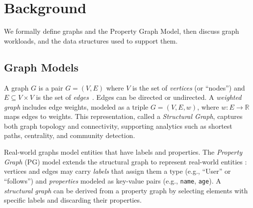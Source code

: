 \section{Background}
\label{sec:bg}
We formally define graphs and the Property Graph Model, then discuss graph workloads, and the data structures used to support them.

\subsection{Graph Models}
\label{sec:bg:model}
A graph $G$ is a pair $G = (V, E)$ where $V$ is the set of \textit{vertices} (or ``nodes'') and $E \subseteq V \times V$ is the set of \textit{edges}~\cite{diestel2017basics}.
Edges can be directed or undirected.
A \emph{weighted graph} includes edge weights, modeled as a triple $G = (V, E, w)$, where $w: E \rightarrow \mathbb{R}$ maps edges to weights.
This representation, called a \emph{Structural Graph}, captures both graph topology and connectivity, supporting analytics such as shortest paths, centrality, and community detection.

Real-world graphs model entities that have labels and properties.
The \emph{Property Graph} (PG) model extends the structural graph to represent real-world entities \cite{Angles_Arenas_Barceló_Hogan_Reutter_Vrgoč_2018, bonifati2018querying}: vertices and edges may carry \emph{labels} that assign them a type (e.g., ``User'' or ``follows'') and \emph{properties} modeled as key-value pairs (e.g., \texttt{name}, \texttt{age}).
A \emph{structural graph} can be derived from a property graph by selecting elements with specific labels and discarding their properties.

